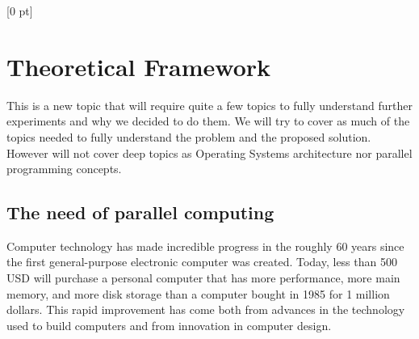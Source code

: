 \titlespacing{\chapter}{0 pt}{30 pt}{50 pt}[0 pt]
\titleformat{\section}{\Large\bfseries}{\thesection}{0 pt}{\hspace{30 pt}}
\titleformat{\subsection}{\large\bfseries}{\thesubsection}{0 pt}{\hspace{30 pt}}
\pagestyle{fancy}
\fancyhead[LO,LE]{\footnotesize\emph{\leftmark}}
\fancyhead[RO,RE]{\thepage}
\fancyfoot[CO,CE]{}

\chapter{Theoretical Framework}

\normalsize
\noindent

This is a new topic that will require quite a few topics to fully understand
further experiments and why we decided to do them. We will try to cover as much
of the topics needed to fully understand the problem and the proposed
solution. However will not cover deep topics as Operating Systems architecture
nor parallel programming concepts.


\section{The need of parallel computing}
\noindent

Computer technology has made incredible progress in the roughly 60 years since
the first general-purpose electronic computer was created. Today, less than 500
USD will purchase a personal computer that has more performance, more main
memory, and more disk storage than a computer bought in 1985 for 1 million
dollars. This rapid improvement has come both from advances in the technology
used to build computers and from innovation in computer design. \cite{Hennessy}

